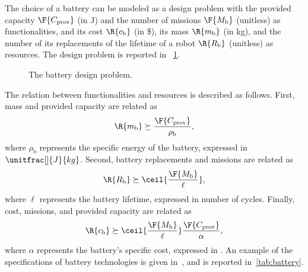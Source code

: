 \begin{example}
The choice of a battery can be modeled as a design problem with the provided capacity $\F{C_\mathrm{prov}}$ (in \unit[]{J}) and the number of missions $\F{M_\mathrm{b}}$ (unitless) as functionalities, and its cost $\R{c_\mathrm{b}}$ (in \unit[]{\$}), its mass $\R{m_\mathrm{b}}$ (in \unit[]{kg}), and the number of its replacements of the lifetime of a robot $\R{R_\mathrm{b}}$ (unitless) as resources. The design problem is reported in
~\cref{fig:battery}. 

\begin{figure}[tbh]
\begin{center}
\end{center}
\caption{The battery design problem.\label{fig:battery}}
\end{figure}

The relation between functionalities and resources is described as follows. First, mass and provided capacity are related as
\begin{equation}
    \R{m_\mathrm{b}}\succeq \frac{\F{C_\mathrm{prov}}}{\rho_\mathrm{b}},
\end{equation}
where $\rho_\mathrm{b}$ represents the specific energy of the battery, expressed in $\unitfrac[]{J}{kg}$. Second, battery replacements and missions are related as
\begin{equation}
    \R{R_\mathrm{b}}\succeq \ceil{\frac{\F{M_\mathrm{b}}}{\ell}},
\end{equation}
where $\ell$ represents the battery lifetime, expressed in number of cycles. Finally, cost, missions, and provided capacity are related as
\begin{equation}
    \R{c_\mathrm{b}}\succeq  \ceil{\frac{\F{M_\mathrm{b}}}{\ell}} \frac{\F{C_\mathrm{prov}}}{\alpha},
\end{equation}
where $\alpha$ represents the battery's specific cost, expressed in . An example of the specifications of battery technologies is given in~\cite{censi2015}, and is reported in~\cref{tab:battery}.


\end{example}
